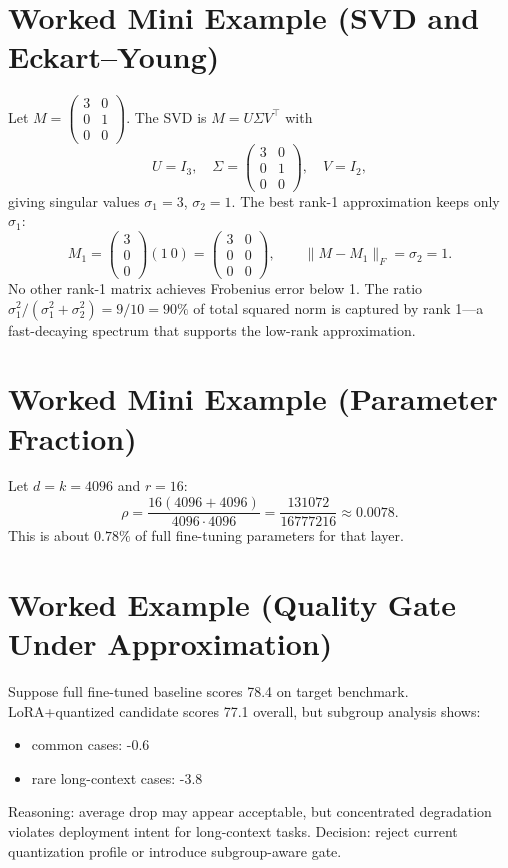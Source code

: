\section*{Worked Mini Example (SVD and Eckart--Young)}
Let $M = \begin{pmatrix}3&0\\0&1\\0&0\end{pmatrix}$. The SVD is $M = U\Sigma V^\top$ with
\[
  U = I_3,\quad \Sigma = \begin{pmatrix}3&0\\0&1\\0&0\end{pmatrix},\quad V = I_2,
\]
giving singular values $\sigma_1=3$, $\sigma_2=1$. The best rank-1 approximation keeps only $\sigma_1$:
\[
  M_1 = \begin{pmatrix}3\\0\\0\end{pmatrix}(1\ 0) = \begin{pmatrix}3&0\\0&0\\0&0\end{pmatrix},
  \qquad
  \|M - M_1\|_F = \sigma_2 = 1.
\]
No other rank-1 matrix achieves Frobenius error below 1. The ratio $\sigma_1^2/(\sigma_1^2+\sigma_2^2) = 9/10 = 90\%$ of total squared norm is captured by rank 1---a fast-decaying spectrum that supports the low-rank approximation.

\section*{Worked Mini Example (Parameter Fraction)}
Let $d=k=4096$ and $r=16$:
\[
\rho=\frac{16(4096+4096)}{4096\cdot4096}
=\frac{131072}{16777216}\approx 0.0078.
\]
This is about $0.78\%$ of full fine-tuning parameters for that layer.

\section*{Worked Example (Quality Gate Under Approximation)}
Suppose full fine-tuned baseline scores 78.4 on target benchmark.  
LoRA+quantized candidate scores 77.1 overall, but subgroup analysis shows:
\begin{itemize}[leftmargin=1.5em]
  \item common cases: -0.6
  \item rare long-context cases: -3.8
\end{itemize}
Reasoning: average drop may appear acceptable, but concentrated degradation violates deployment intent for long-context tasks.  
Decision: reject current quantization profile or introduce subgroup-aware gate.

